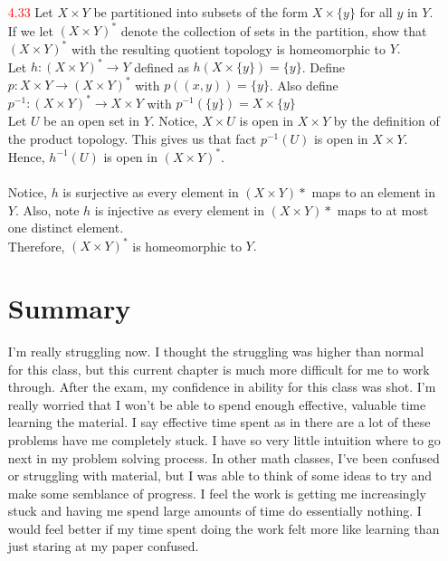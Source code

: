 \documentclass[12pt]{article}
\begin{document}
\begin{enumerate}
	\item[\textcolor{red}{4.33}] Let $X \times Y$ be partitioned into subsets of the form $X \times \{ y \}$ for all $y$ in $Y .$ If we let $( X \times Y ) ^ { * }$ denote the collection of sets in the partition, show that $( X \times Y ) ^ { * }$ with the resulting quotient topology is homeomorphic to $Y .$\\
	Let $ h : (X\times Y)^* \rightarrow Y $ defined as $ h(X\times \{y\}) =\{y\} $. Define $ p : X\times Y \rightarrow (X\times Y)^*$ with $ p((x,y))=\{y\} $. Also define $p^{-1}:(X\times Y)^*\rightarrow X\times Y$ with  $ p^{-1}(\{y\})=X\times\{y\} $\\
	 Let $ U $ be an open set in $ Y $. Notice, $ X\times U $ is open in $ X\times Y $ by the definition of the product topology. This gives us that fact $ p^{-1}(U) $ is open in $ X\times Y $. Hence, $ h^{-1}(U) $ is open in $ (X\times Y)^* $.\\
	 \\
	 Notice, $ h $ is surjective as every element in $ (X\times Y)* $ maps to an element in $ Y $. Also, note $ h $ is injective as every element in $ (X\times Y)* $ maps to at most one distinct element.\\
	 Therefore, $( X \times Y ) ^ { * }$ is homeomorphic to $Y .$\\
	 	

	\section*{Summary}
	I'm really struggling now. I thought the struggling was higher than normal for this class, but this current chapter is much more difficult for me to work through. After the exam, my confidence in ability for this class was shot. I'm really worried that I won't be able to spend enough effective, valuable time learning the material. I say effective time spent as in there are a lot of these problems have me completely stuck. I have so very little intuition where to go next in my problem solving process. In other math classes, I've been confused or struggling with material, but I was able to think of some ideas to try and make some semblance of progress. I feel the work is getting me increasingly stuck and having me spend large amounts of time do essentially nothing. I would feel better if my time spent doing the work felt more like learning than just staring at my paper confused.
\end{enumerate}
 
\end{document}
